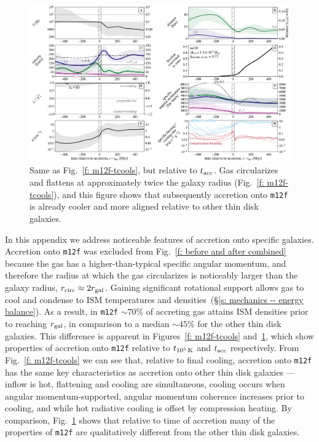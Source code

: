 \documentclass[fleqn,usenatbib]{mnras}
\newcommand{\tcools}{t_{10^5\,{\rm K}}}
\newcommand{\tacc}{t_{\rm acc}}
\newcommand{\Rcirc}[0]{r_{\rm circ}}
\begin{document}
\begin{figure}\includegraphics[width=\textwidth]{figures/variations/relative_to_accretion/before_and_after/before_and_after_allone_m12f_md.pdf}
\caption{
Same as Fig.~\ref{f: m12f-tcools}, but relative to $\tacc$.
Gas circularizes and flattens at approximately twice the galaxy radius (Fig.~\ref{f: m12f-tcools}), and this figure shows that subsequently accretion onto \texttt{m12f} is already cooler and more aligned relative to other thin disk galaxies.
}
\label{f: m12f-tacc}
\end{figure}

In this appendix we address noticeable features of accretion onto specific galaxies.
Accretion onto \texttt{m12f} was excluded from Fig.~\ref{f: before and after combined} because the gas has a higher-than-typical specific angular momentum, and therefore the radius at which the gas circularizes is noticeably larger than the galaxy radius, $\Rcirc \approx 2 r_{\rm gal}$.
Gaining significant rotational support allows gas to cool and condense to ISM temperatures and densities~(\S\ref{s: mechanics -- energy balance}).
As a result, in \texttt{m12f} $\sim70\%$ of accreting gas attains ISM densities prior to reaching $r_{\rm gal}$, in comparison to a median $\sim45\%$ for the other thin disk galaxies.
This difference is apparent in Figures~\ref{f: m12f-tcools} and~\ref{f: m12f-tacc}, which show properties of accretion onto \texttt{m12f} relative to $\tcools$ and $\tacc$ respectively.
From Fig.~\ref{f: m12f-tcools} we can see that, relative to final cooling, accretion onto \texttt{m12f} has the same key characteristics as accretion onto other thin disk galaxies --- inflow is hot, flattening and cooling are simultaneous, cooling occurs when angular momentum-supported, angular momentum coherence increases prior to cooling, and while hot radiative cooling is offset by compression heating.
By comparison, Fig.~\ref{f: m12f-tacc} shows that relative to time of accretion many of the properties of \texttt{m12f} are qualitatively different from the other thin disk galaxies.
\end{document}
